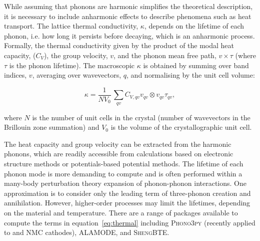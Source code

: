 \documentclass[../main.tex]{subfiles}
\begin{document}
While assuming that phonons are harmonic simplifies the theoretical description, it is necessary to include anharmonic effects to describe phenomena such as heat transport. The lattice thermal conductivity, $\kappa$, depends on the lifetime of each phonon, i.e. how long it persists before decaying, which is an anharmonic process. Formally, the thermal conductivity given by the product of the modal heat capacity, ($C_V$), the group velocity, $v$, and the phonon mean free path, $v \times \tau$ (where $\tau$ is the phonon lifetime). The macroscopic $\kappa$ is obtained by summing over band indices, $v$, averaging over wavevectors, $q$, and normalising by the unit cell volume:

\begin{equation}
    \kappa = \frac{1}{NV_0} \,\sum_{qv} C_{V,qv} v_{qv} \otimes v_{qv} \tau_{qv},
    \label{eq:thermal}
\end{equation}

where $N$ is the number of unit cells in the crystal (number of wavevectors in the Brillouin zone summation) and $V_0$ is the volume of the crystallographic unit cell.

The heat capacity and group velocity can be extracted from the harmonic phonons, which are readily accessible from calculations based on electronic structure methods or potentials-based potential methods. The lifetime of each phonon mode is more demanding to compute and is often performed within a many-body perturbation theory expansion of phonon-phonon interactions. One approximation is to consider only the leading term of three-phonon creation and annihilation. \cite{togo_distributions_2015} However, higher-order processes may limit the lifetimes, depending on the material and temperature. There are a range of packages available to compute the terms in equation~\ref{eq:thermal} including \textsc{Phono3py} \cite{togo_distributions_2015} (recently applied to  and NMC cathodes)\cite{yang2019highly,yang2020chemical}, \textsc{ALAMODE}\cite{tadano2014anharmonic}, and \textsc{ShengBTE}\cite{ShengBTE_2014}.

 
\end{document}
